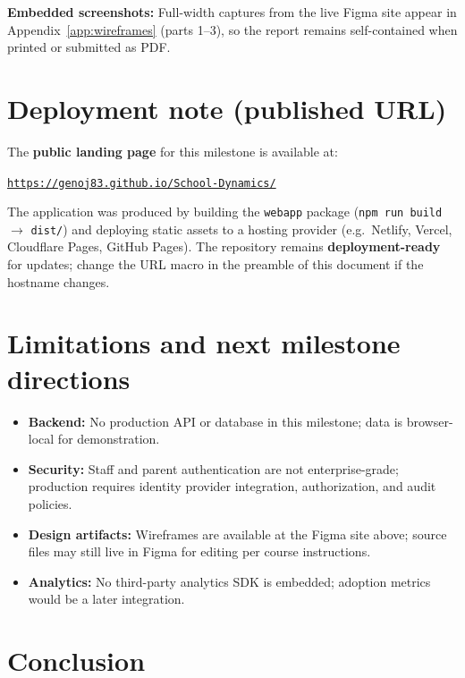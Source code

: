 \documentclass[11pt,a4paper]{article}
\newcommand{\PublishedLandingURL}{https://genoj83.github.io/School-Dynamics/}
\begin{document}
\noindent
\textbf{Embedded screenshots:} Full-width captures from the live Figma site appear in Appendix~\ref{app:wireframes} (parts 1--3), so the report remains self-contained when printed or submitted as PDF.

\section{Deployment note (published URL)}

The \textbf{public landing page} for this milestone is available at:

\begin{center}
\href{\PublishedLandingURL}{\texttt{\PublishedLandingURL}}
\end{center}

\noindent
The application was produced by building the \texttt{webapp} package (\texttt{npm run build} $\rightarrow$ \texttt{dist/}) and deploying static assets to a hosting provider (e.g.\ Netlify, Vercel, Cloudflare Pages, GitHub Pages). The repository remains \textbf{deployment-ready} for updates; change the URL macro in the preamble of this document if the hostname changes.

\section{Limitations and next milestone directions}

\begin{itemize}[leftmargin=*]
  \item \textbf{Backend:} No production API or database in this milestone; data is browser-local for demonstration.
  \item \textbf{Security:} Staff and parent authentication are not enterprise-grade; production requires identity provider integration, authorization, and audit policies.
  \item \textbf{Design artifacts:} Wireframes are available at the Figma site above; source files may still live in Figma for editing per course instructions.
  \item \textbf{Analytics:} No third-party analytics SDK is embedded; adoption metrics would be a later integration.
\end{itemize}

\section{Conclusion}
\end{document}
